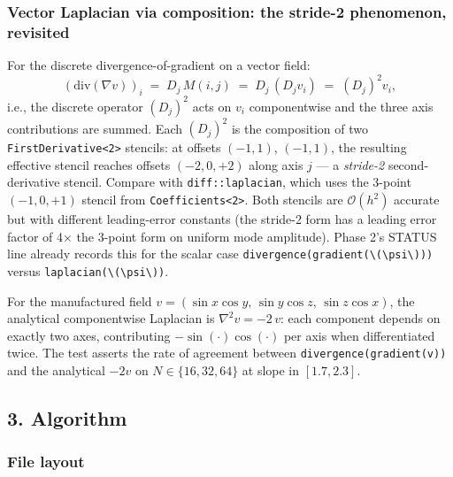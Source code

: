 \subsubsection{Vector Laplacian via composition: the stride-2
phenomenon, revisited}\label{phase13-stride2}

For the discrete divergence-of-gradient on a vector field:
\[
(\mathrm{div}(\nabla v))_i \;=\; D_j\,M(i, j) \;=\; D_j\,(D_j v_i) \;=\; (D_j)^2 v_i,
\]
i.e., the discrete operator
\((D_j)^2\) acts on \(v_i\) componentwise and the three axis
contributions are summed. Each \((D_j)^2\) is the composition of two
\passthrough{\lstinline!FirstDerivative<2>!} stencils: at offsets
\((-1, 1)\), \((-1, 1)\), the resulting effective stencil reaches
offsets \((-2, 0, +2)\) along axis \(j\) — a \emph{stride-2}
second-derivative stencil. Compare with
\passthrough{\lstinline!diff::laplacian!}, which uses the 3-point
\((-1, 0, +1)\) stencil from
\passthrough{\lstinline!Coefficients<2>!}. Both stencils are
\(\mathcal{O}(h^2)\) accurate but with different leading-error
constants (the stride-2 form has a leading error factor of 4× the
3-point form on uniform mode amplitude). Phase 2's STATUS line
already records this for the scalar case
\passthrough{\lstinline!divergence(gradient(\(\psi\)))!} versus
\passthrough{\lstinline!laplacian(\(\psi\))!}.

For the manufactured field
\(v = (\sin x \cos y,\, \sin y \cos z,\, \sin z \cos x)\), the
analytical componentwise Laplacian is \(\nabla^2 v = -2\,v\): each
component depends on exactly two axes, contributing
\(-\sin(\cdot)\cos(\cdot)\) per axis when differentiated twice. The
test asserts the rate of agreement between
\passthrough{\lstinline!divergence(gradient(v))!} and the analytical
\(-2v\) on \(N \in \{16, 32, 64\}\) at slope in
\([1.7, 2.3]\).

\subsection{3. Algorithm}\label{phase13-algorithm}

\subsubsection{File layout}\label{phase13-files}

